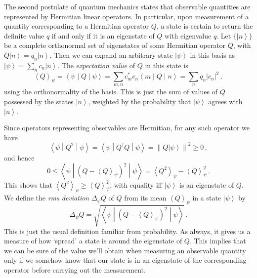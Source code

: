 \documentclass{article}
\theoremstyle{plain}\theoremheaderfont{\normalfont\itshape}\theorembodyfont{\rmfamily}\theoremseparator{.}\newtheorem*{rem}{Remark}\newtheorem*{ex}{Example}\newtheorem*{proof}{Proof}\newtheorem*{altp}{Alternative proof}
\theoremstyle{plain}\theoremheaderfont{\normalfont\bfseries}\theorembodyfont{\rmfamily}\theoremseparator{.}\newtheorem{thm}{Theorem}[section]\newtheorem{lem}[thm]{Lemma}\newtheorem{prop}[thm]{Proposition}\newtheorem*{cor}{Corollary}\newtheorem{defn}[thm]{Definition}\newtheorem{clm}[thm]{Claim}\newtheorem{clminproof}{Claim}
\theoremstyle{break}\theoremheaderfont{\normalfont\itshape}\theorembodyfont{\rmfamily}\theoremseparator{.\medskip}\newtheorem*{proofskip}{Proof}\newtheorem*{exs}{Examples}\newtheorem*{rems}{Remarks}
\theoremstyle{break}\theoremheaderfont{\normalfont\bfseries}\theorembodyfont{\rmfamily}\theoremseparator{.\medskip}\newtheorem{lemskip}[thm]{Lemma}\newtheorem{defnskip}[thm]{Definition}\newtheorem{propskip}[thm]{Proposition}\newtheorem{thmskip}[thm]{Theorem}
\numberwithin{equation}{section}
\newcommand{\ket}[1]{\left| #1 \right\rangle}
\newcommand{\mel}[3]{\left\langle #1 \middle| #2 \middle| #3 \right\rangle}
\newcommand{\eval}[1]{\left\langle #1 \right\rangle}
\newcommand{\expval}[2]{\left\langle #2 \middle| #1 \middle| #2 \right\rangle}
\newcommand{\abs}[1]{\left| #1 \right|}
\newcommand{\norm}[1]{\left\| #1 \right\|}
\begin{document}
    The second postulate of quantum mechanics states that observable quantities are represented by Hermitian linear operators. In particular, upon measurement of a quantity corresponding to a Hermitian operator \(Q\), a state is certain to return the definite value \(q\) if and only if it is an eigenstate of \(Q\) with eigenvalue \(q\). Let \(\{\ket{n}\}\) be a complete orthonormal set of eigenstates of some Hermitian operator \(Q\), with \(Q\ket{n}=q_n\ket{n}\). Then we can expand an arbitrary state \(\ket{\psi}\) in this basis as \(\ket{\psi}=\sum_n c_n\ket{n}\). The \textit{expectation value} of \(Q\) in this state is
    \begin{equation}
        \eval{Q}_\psi=\expval{Q}{\psi}=\sum_{m,n}c_m^* c_n\mel{m}{Q}{n}=\sum_n q_n\abs{c_n}^2\,,
    \end{equation}
    using the orthonormality of the basis. This is just the sum of values of \(Q\) possessed by the states \(\ket{n}\), weighted by the probability that \(\ket{\psi}\) agrees with \(\ket{n}\).

    Since operators representing observables are Hermitian, for any such operator we have
    \begin{equation}
        \expval{Q^2}{\psi}=\expval{Q^\dagger Q}{\psi}=\norm{Q\ket{\psi}}^2\ge 0\,,
    \end{equation}
    and hence
    \begin{equation}
        0\le\expval{(Q-\eval{Q}_\psi)^2}{\psi}=\eval{Q^2}_\psi -\eval{Q}_\psi^2\,.
    \end{equation}
    This shows that \(\eval{Q^2}_\psi\ge\eval{Q}_\psi^2\), with equality iff \(\ket{\psi}\) is an eigenstate of \(Q\). We define the \textit{rms deviation} \(\Delta_\psi Q\) of \(Q\) from its mean \(\eval{Q}_\psi\) in a state \(\ket{\psi}\) by
    \begin{equation}
        \Delta_\psi Q=\sqrt{\expval{(Q-\eval{Q}_\psi)^2}{\psi}}\,.
    \end{equation}
    This is just the usual definition familiar from probability. As always, it gives us a measure of how `spread' a state is around the eigenstate of \(Q\). This implies that we can be sure of the value we'll obtain when measuring an observable quantity only if we somehow know that our state is in an eigenstate of the corresponding operator before carrying out the measurement.
\end{document}
